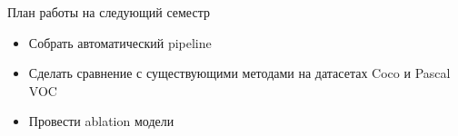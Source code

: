 \documentclass{beamer}
\begin{document}


\begin{frame}{План работы на следующий семестр}

\begin{itemize}
    \item  Собрать автоматический pipeline
    \item  Сделать сравнение с существующими методами на датасетах Coco и Pascal VOC
    \item  Провести ablation модели
\end{itemize}

\end{frame}
\end{document}
